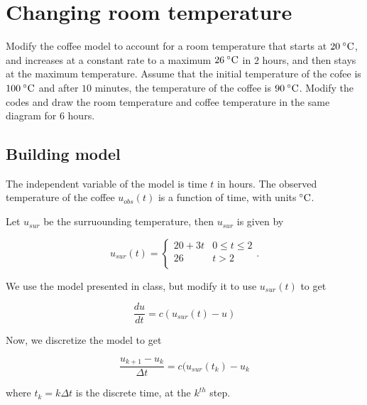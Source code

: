 \documentclass[11pt,oneside]{extarticle}
\newcommand{\Celsius}{\:\degree\mathrm{C}}
\begin{document}
\section{Changing room temperature}

\par Modify the coffee model to account for a room temperature that starts at $20\Celsius$,
and increases at a constant rate to a maximum $26\Celsius$ in $2$ hours, and then
stays at the maximum temperature. Assume that the initial temperature of the cofee
is $100\Celsius$ and after $10$ minutes, the temperature of the coffee is $90\Celsius$.
Modify the codes and draw the room temperature and coffee temperature in the same
diagram for $6$ hours.

\subsection{Building model}

\par The independent variable of the model is time $t$ in hours. The observed temperature
of the coffee $u_{obs}(t)$ is a function of time, with units$\Celsius$.

\par Let $u_{sur}$ be the surruounding temperature, then $u_{sur}$ is given by

\begin{equation}
    u_{sur}(t) = 
    \begin{cases} 
        20 + 3t & 0 \leq t \leq 2 \\
        26 & t > 2 \\
    \end{cases}.
\end{equation}

\par We use the model presented in class, but modify it to use $u_{sur}(t)$ to
get 

\begin{equation}
    \frac{du}{dt}
    =
    c(u_{sur}(t)-u)
\end{equation}

Now, we discretize the model to get

\begin{equation}
    \frac{u_{k+1} - u_k}{\Delta t}
    =
    c(u_{sur}(t_k) - u_k
\end{equation}

where $t_k = k\Delta t$ is the discrete time, at the $k^{th}$ step.

\newpage
\end{document}
